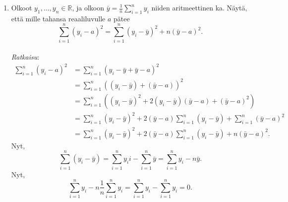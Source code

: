 \documentclass[12pt]{article}
\begin{document}
\begin{enumerate}
\item[5.]  Olkoot $y_1, \ldots, y_n \in \mathbb{R}$, ja olkoon $\bar{y} = \frac{1}{n} \sum_{i = 1}^n y_i$ niiden aritmeettinen ka. Näytä, että mille tahansa reaaliluvulle $a$ pätee
$$
\sum_{i = 1}^n (y_i - a)^2 = \sum_{i = 1}^n (y_i - \bar{y})^2 + n(\bar{y} - a)^2.
$$
\\
\textit{Ratkaisu}:
$$
\begin{aligned}
\sum_{i = 1}^n (y_i - a)^2 &= \sum_{i = 1}^n (y_i - \bar{y} + \bar{y} - a)^2 \\
    &= \sum_{i = 1}^n ((y_i - \bar{y}) + (\bar{y} - a))^2 \\
    &= \sum_{i = 1}^n  ((y_i - \bar{y})^2 + 2 (y_i - \bar{y})(\bar{y} - a) + (\bar{y} - a)^2) \\
    &= \sum_{i = 1}^n (y_i - \bar{y})^2 + 2(\bar{y} - a)\sum_{i = 1}^n(y_i - \bar{y}) + \sum_{i = 1}^n (\bar{y} - a)^2 \\
    &= \sum_{i = 1}^n (y_i - \bar{y})^2 + 2(\bar{y} - a)\sum_{i = 1}^n(y_i - \bar{y}) + n(\bar{y} - a)^2.
\end{aligned}
$$
Nyt, 
$$
\sum_{i = 1}^n (y_i -\bar{y}) = \sum_{i = 1}^n y_ii - \sum_{i = 1}^n \bar{y} = \sum_{i = 1}^n y_i - n\bar{y}. 
$$
Nyt,
$$
\sum_{i = 1}^n y_i - n \frac{1}{n} \sum_{i = 1}^n y_i = \sum_{i = 1}^n y_i - \sum_{i = 1}^n y_i = 0.
$$
\end{enumerate}
\end{document}
